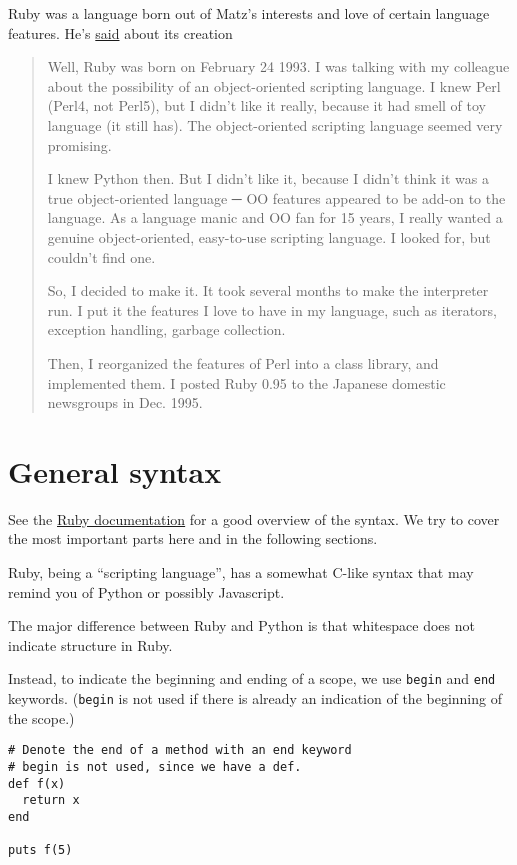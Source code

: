 \documentclass[11pt]{article}
\begin{document}
Ruby was a language born out of Matz's interests
and love of certain language features.
He's \href{https://ruby-doc.org/docs/ruby-doc-bundle/FAQ/FAQ.html}{said}
about its creation
\begin{quote}
Well, Ruby was born on February 24 1993.
I was talking with my colleague about the possibility of
an object-oriented scripting language.
I knew Perl (Perl4, not Perl5), but I didn't like it really,
because it had smell of toy language (it still has).
The object-oriented scripting language seemed very promising.

I knew Python then. But I didn't like it,
because I didn't think it was a true object-oriented language
─ OO features appeared to be add-on to the language.
As a language manic and OO fan for 15 years,
I really wanted a genuine object-oriented,
easy-to-use scripting language.
I looked for, but couldn't find one.

So, I decided to make it.
It took several months to make the interpreter run.
I put it the features I love to have in my language,
such as iterators, exception handling, garbage collection.

Then, I reorganized the features of Perl into a class library,
and implemented them. I posted Ruby 0.95 to
the Japanese domestic newsgroups in Dec. 1995.
\end{quote}

\section{General syntax}
\label{sec:org1182064}
See the
\href{https://docs.ruby-lang.org/en/2.4.0/syntax\_rdoc.html}{Ruby documentation}
for a good overview of the syntax. We try to cover
the most important parts here and in the following sections.

Ruby, being a “scripting language”, has a somewhat C-like syntax
that may remind you of Python or possibly Javascript.

The major difference between Ruby and Python
is that whitespace does not indicate structure in Ruby.

Instead, to indicate the beginning and ending of a scope,
we use \texttt{begin} and \texttt{end} keywords.
(\texttt{begin} is not used if there is already an indication
of the beginning of the scope.)
\begin{verbatim}
# Denote the end of a method with an end keyword
# begin is not used, since we have a def.
def f(x)
  return x
end

puts f(5)
\end{verbatim}
\end{document}

